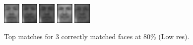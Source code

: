 \begin{figure}[hbt]
  \includegraphics[width=0.073\textwidth]{../results/L_rez/correct80/3/6.jpg}
  \includegraphics[width=0.073\textwidth]{../results/L_rez/correct80/3/7.jpg}
  \includegraphics[width=0.073\textwidth]{../results/L_rez/correct80/3/8.jpg}
  \includegraphics[width=0.073\textwidth]{../results/L_rez/correct80/3/9.jpg}
  \includegraphics[width=0.073\textwidth]{../results/L_rez/correct80/3/10.jpg}
  \caption{Top matches for 3 correctly matched faces at 80\% (Low res).}
  \label{fig:correct80_l}
\end{figure}

~\vfill

